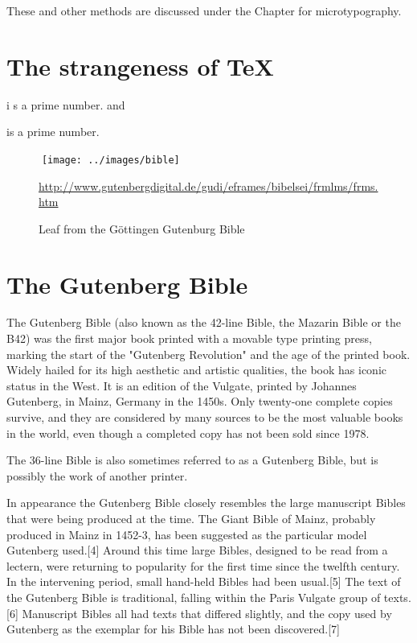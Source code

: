 {{These and other methods are discussed under the Chapter for microtypography. 
\section{The strangeness of TeX}

{
 i s a prime number.
and

 is  a prime number.
}




\begin{figure*}
^^A\texttt{[image: ../images/bible]}
\caption{Leaf from the G\"ottingen Gutenburg Bible}
\url{http://www.gutenbergdigital.de/gudi/eframes/bibelsei/frmlms/frms.htm}
\label{fig:bible}
\end{figure*}

\section{The Gutenberg Bible}

The Gutenberg Bible (also known as the 42-line Bible, the Mazarin Bible or the B42) was the first major book printed with a movable type printing press, marking the start of the "Gutenberg Revolution" and the age of the printed book. Widely hailed for its high aesthetic and artistic qualities,\cite{Martin1996} the book has iconic status in the West. It is an edition of the Vulgate, printed by Johannes Gutenberg, in Mainz, Germany in the 1450s. Only twenty-one complete copies survive, and they are considered by many sources to be the most valuable books in the world, even though a completed copy has not been sold since 1978.

The 36-line Bible is also sometimes referred to as a Gutenberg Bible, but is possibly the work of another printer.

In appearance the Gutenberg Bible closely resembles the large manuscript Bibles that were being produced at the time. The Giant Bible of Mainz, probably produced in Mainz in 1452-3, has been suggested as the particular model Gutenberg used.[4] Around this time large Bibles, designed to be read from a lectern, were returning to popularity for the first time since the twelfth century. In the intervening period, small hand-held Bibles had been usual.[5] The text of the Gutenberg Bible is traditional, falling within the Paris Vulgate group of texts.[6] Manuscript Bibles all had texts that differed slightly, and the copy used by Gutenberg as the exemplar for his Bible has not been discovered.[7]

}}
